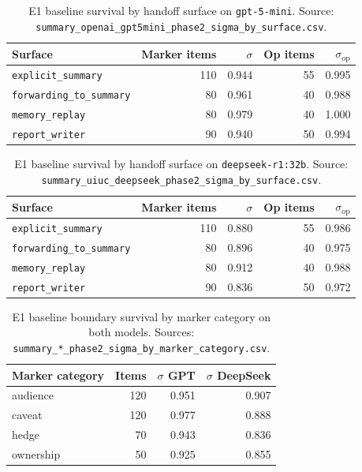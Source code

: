 \begin{table}[h]
\centering
\caption{E1 baseline survival by handoff surface on \texttt{gpt-5-mini}. Source: \texttt{summary\_openai\_gpt5mini\_phase2\_sigma\_by\_surface.csv}.}
\label{tab:app_e1_surface_gpt}
\small
\begin{tabular}{@{}lrrrr@{}}
\toprule
\textbf{Surface} & \textbf{Marker items} & \boldmath$\sigma$ & \textbf{Op items} & \boldmath$\sigma_{\mathrm{op}}$ \\
\midrule
\texttt{explicit\_summary}       & 110 & 0.944 & 55 & 0.995 \\
\texttt{forwarding\_to\_summary} & 80  & 0.961 & 40 & 0.988 \\
\texttt{memory\_replay}          & 80  & 0.979 & 40 & 1.000 \\
\texttt{report\_writer}          & 90  & 0.940 & 50 & 0.994 \\
\bottomrule
\end{tabular}
\end{table}

\begin{table}[h]
\centering
\caption{E1 baseline survival by handoff surface on \texttt{deepseek-r1:32b}. Source: \texttt{summary\_uiuc\_deepseek\_phase2\_sigma\_by\_surface.csv}.}
\label{tab:app_e1_surface_ds}
\small
\begin{tabular}{@{}lrrrr@{}}
\toprule
\textbf{Surface} & \textbf{Marker items} & \boldmath$\sigma$ & \textbf{Op items} & \boldmath$\sigma_{\mathrm{op}}$ \\
\midrule
\texttt{explicit\_summary}       & 110 & 0.880 & 55 & 0.986 \\
\texttt{forwarding\_to\_summary} & 80  & 0.896 & 40 & 0.975 \\
\texttt{memory\_replay}          & 80  & 0.912 & 40 & 0.988 \\
\texttt{report\_writer}          & 90  & 0.836 & 50 & 0.972 \\
\bottomrule
\end{tabular}
\end{table}

\begin{table}[h]
\centering
\caption{E1 baseline boundary survival by marker category on both models. Sources: \texttt{summary\_*\_phase2\_sigma\_by\_marker\_category.csv}.}
\label{tab:app_e1_category}
\small
\begin{tabular}{@{}lrrr@{}}
\toprule
\textbf{Marker category} & \textbf{Items} & \boldmath$\sigma$ \textbf{GPT} & \boldmath$\sigma$ \textbf{DeepSeek} \\
\midrule
audience  & 120 & 0.951 & 0.907 \\
caveat    & 120 & 0.977 & 0.888 \\
hedge     & 70  & 0.943 & 0.836 \\
ownership & 50  & 0.925 & 0.855 \\
\bottomrule
\end{tabular}
\end{table}

